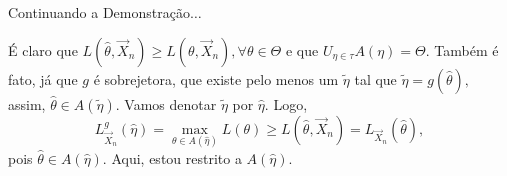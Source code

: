 \documentclass[12pt]{beamer}
\begin{document}
\begin{frame}{Continuando a Demonstração$\ldots$}
	\begin{block}{}
		\justifying
	É claro que $L(\hat{\theta},\vec{X}_{n})\geq L(\theta,\vec{X}_{n}), \forall \theta\in \Theta$ e que ${\displaystyle U_{\eta\in \tau}}A(\eta)=\Theta.$ Também é fato, já que $g$ é sobrejetora, que existe pelo menos um $\tilde{\eta}$ tal que $\tilde{\eta}=g(\hat{\theta}),$ assim, $\hat{\theta}\in A(\tilde{\eta}).$ Vamos denotar $\tilde{\eta}$ por $\hat{\eta}.$ Logo, $$L_{\vec{X}_{n}}^{g}(\hat{\eta})=\max_{\theta\in A(\hat{\eta})}L(\theta)\geq L(\hat{\theta},\vec{X}_{n})=L_{\vec{X}_{n}}(\hat{\theta}),$$ pois $\hat{\theta}\in A(\hat{\eta}).$ Aqui, estou restrito a $A(\hat{\eta}).$
	\end{block}
\end{frame}

%		
%		
%		
%		
%		
%		
\end{document}
